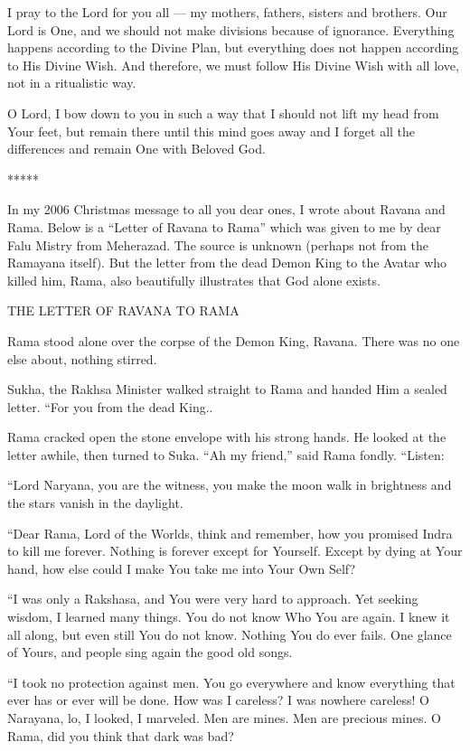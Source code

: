 I pray to the Lord for you all --- my mothers, fathers, sisters and brothers. Our Lord is One, and we should not make divisions because of ignorance. Everything happens according to the Divine Plan, but everything does not happen according to His Divine Wish. And therefore, we must follow His Divine Wish with all love, not in a ritualistic way.

O Lord, I bow down to you in such a way that I should not lift my head from Your feet, but remain there until this mind goes away and I forget all the differences and remain One with Beloved God.

*****

In my 2006 Christmas message to all you dear ones, I wrote about Ravana and Rama. Below is a ``Letter of Ravana to Rama'' which was given to me by dear Falu Mistry from Meherazad. The source is unknown (perhaps not from the Ramayana itself). But the letter from the dead Demon King to the Avatar who killed him, Rama, also beautifully illustrates that God alone exists.

THE LETTER OF RAVANA TO RAMA

Rama stood alone over the corpse of the Demon King, Ravana. There was no one else about, nothing stirred.

Sukha, the Rakhsa Minister walked straight to Rama and handed Him a sealed letter. ``For you from the dead King..

Rama cracked open the stone envelope with his strong hands. He looked at the letter awhile, then turned to Suka. ``Ah my friend,'' said Rama fondly. ``Listen:

``Lord Naryana, you are the witness, you make the moon walk in brightness and the stars vanish in the daylight.

``Dear Rama, Lord of the Worlds, think and remember, how you promised Indra to kill me forever. Nothing is forever except for Yourself. Except by dying at Your hand, how else could I make You take me into Your Own Self?

``I was only a Rakshasa, and You were very hard to approach. Yet seeking wisdom, I learned many things. You do not know Who You are again. I knew it all along, but even still You do not know. Nothing You do ever fails. One glance of Yours, and people sing again the good old songs.

``I took no protection against men. You go everywhere and know everything that ever has or ever will be done. How was I careless? I was nowhere careless! O Narayana, lo, I looked, I marveled. Men are mines. Men are precious mines. O Rama, did you think that dark was bad?

